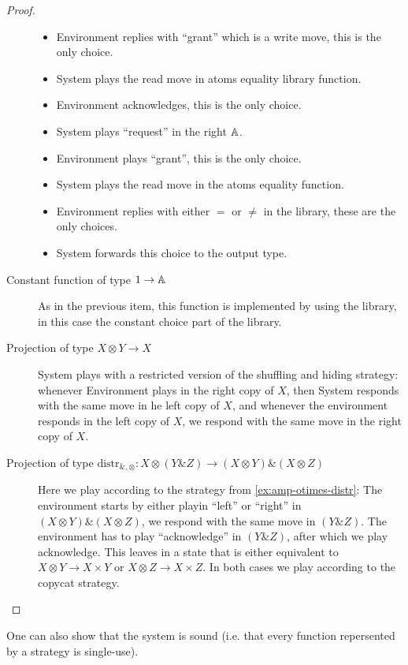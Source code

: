 \begin{proof}
\begin{description}
\begin{itemize}
    \item Environment replies with ``grant'' which is a write move, this is the only choice.
    \item System plays the read move in atoms equality library function.
    \item Environment acknowledges, this is the only choice.
    \item System plays  ``request'' in the right $\mathbb A$.
    \item Environment plays ``grant'', this is the only choice.
    \item System plays the read move in the atoms equality function.
    \item Environment replies with either $=$ or $\neq$ in the library, these are the only choices.
    \item System forwards this choice to the output type.
\end{itemize}
        

        \item[Constant function of type $1 \to \mathbb A$] As in the previous item, this function is implemented by using the library, in this case the constant choice part of the library. 

        \item[Projection of type $ X \otimes Y \to X$] System plays with a restricted version of the shuffling and hiding strategy:
        whenever Environment plays in the right copy of $X$, then System responds with the same move in he left copy of $X$, 
        and whenever the environment responds in the left copy of $X$, we respond with the same move in the right 
        copy of $X$. 

        \item[Projection of type $\textrm{distr}_{\&, \otimes} : X \otimes (Y \& Z) \to (X \otimes Y) \& (X \otimes Z)$]
        Here we play according to the strategy from \ref{ex:amp-otimes-distr}: The environment 
        starts by either playin ``left'' or ``right'' in $(X \otimes Y) \& (X \otimes Z)$, 
        we respond with the same move in $(Y \& Z)$. The environment has to play ``acknowledge'' 
        in $(Y \& Z)$, after which we play acknowledge. This leaves in a state that is either 
        equivalent to $X \otimes Y \to X \times Y$ or  $X \otimes Z \to X \times Z$. 
        In both cases we play according to the copycat strategy.  
    \end{description}
\end{proof}
One can also show that the system is sound (i.e. that every function repersented by a strategy is single-use). 

